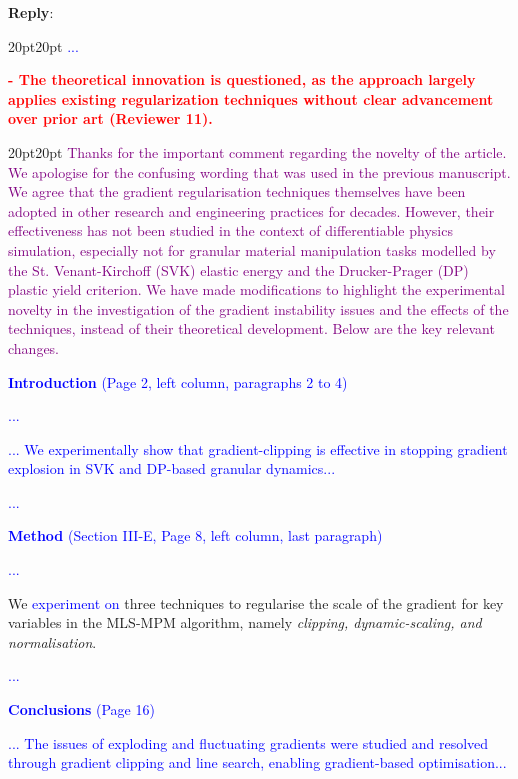 \documentclass[11pt]{article}
\newenvironment{reply}
   {\medskip \noindent \begin{sf}\textbf{Reply}: \  }
   {\medskip \end{sf}}
\newcommand{\rv}[1]{\textcolor{red}{#1}}
\newcommand{\rp}[1]{\textcolor{purple}{#1}}
\newcommand{\xt}[1]{\textcolor{blue}{#1}}
\begin{document}
\begin{reply}
\begin{adjustwidth}{20pt}{20pt}
\xt{...}

\end{adjustwidth}

\vspace{0.3cm}\noindent\rv{\textbf{- The theoretical innovation is questioned, as the approach largely applies existing regularization techniques without clear advancement over prior art (Reviewer 11).}}
\begin{adjustwidth}{20pt}{20pt}
\rp{Thanks for the important comment regarding the novelty of the article. We apologise for the confusing wording that was used in the previous manuscript. We agree that the gradient regularisation techniques themselves have been adopted in other research and engineering practices for decades. However, their effectiveness has not been studied in the context of differentiable physics simulation, especially not for granular material manipulation tasks modelled by the St. Venant-Kirchoff (SVK) elastic energy and the Drucker-Prager (DP) plastic yield criterion. We have made modifications to highlight the experimental novelty in the investigation of the gradient instability issues and the effects of the techniques, instead of their theoretical development. Below are the key relevant changes.}

\vspace{0.3cm}\noindent\xt{\textbf{Introduction} (Page 2, left column, paragraphs 2 to 4)}

\xt{...}

\xt{... We experimentally show that gradient-clipping is effective in stopping gradient explosion in SVK and DP-based granular dynamics...}

\xt{...}

\vspace{0.3cm}\noindent\xt{\textbf{Method} (Section III-E, Page 8, left column, last paragraph)}

\xt{...}

We \xt{experiment on} three techniques to regularise the scale of the gradient for key variables in the MLS-MPM algorithm, namely \textit{clipping, dynamic-scaling, and normalisation}.

\xt{...}

\vspace{0.3cm}\noindent\xt{\textbf{Conclusions} (Page 16)}

\xt{... The issues of exploding and fluctuating gradients were studied and resolved through gradient clipping and line search, enabling gradient-based optimisation...}


\end{adjustwidth}
\end{reply}
\end{document}
